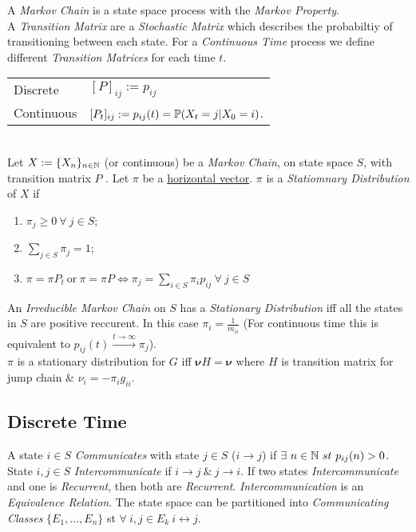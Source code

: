 \documentclass[11pt,a4paper]{article}
\begin{document}
A \textit{Markov Chain} is a state space process with the \textit{Markov Property}.\\

A \textit{Transition Matrix} are a \textit{Stochastic Matrix} which describes the probabiltiy of transitioning between each state. For a \textit{Continuous Time} process we define different \textit{Transition Matrices} for each time $t$.\\
\begin{tabular}{ll}
Discrete&$[P]_{ij}:=p_{ij}$\\
Continuous&$[P_t]_{ij}:=p_{ij}(t)=\mathbb{P}(X_t=j|X_0=i)$.
\end{tabular}\\

Let $X:=\{X_n\}_{n\in\mathbb{N}}$ (or continuous) be a \textit{Markov Chain}, on state space $S$, with transition matrix $P$ . Let $\pi$ be a \underline{horizontal vector}. $\pi$ is a \textit{Statiomnary Distribution} of $X$ if
\begin{enumerate}
	\item $\pi_j\geq0\ \forall\ j\in S$;
	\item $\sum_{j\in S}\pi_j=1$;
	\item $\pi=\pi P_t\ \mathrm{or}\ \pi=\pi P\Leftrightarrow\pi_j=\sum_{i\in S}\pi_ip_{ij}\ \forall\ j\in S$
\end{enumerate}
An \textit{Irreducible Markov Chain} on $S$ has a \textit{Stationary Distribution} iff all the states in $S$ are positive reccurent. In this case $\pi_i=\frac{1}{m_{ii}}$ (For continuous time this is equivalent to $p_{ij}(t)\xrightarrow{t\to\infty}\pi_j$).\\
\nb $\pi$ is a stationary distribution for $G$ iff $\pmb{\nu} H=\pmb{\nu}$ where $H$ is transition matrix for jump chain \& $\nu_i=-\pi_ig_{ii}$.

\subsection{Discrete Time}

A state $i\in S$ \textit{Communicates} with state $j\in S$ ($i\to j$) if $\exists\ n\in\nats\ st\ p_{ij}(n)>0$. State $i,j\in S$ \textit{Intercommunicate} if $i\to j\ \&\ j\to i$. If two states \textit{Intercommunicate} and one is \textit{Recurrent}, then both are \textit{Recurrent}. \textit{Intercommunication} is an \textit{Equivalence Relation}. The state space can be partitioned into \textit{Communicating Classes} $\{E_1,\dots,E_n\}$ st $\forall\ i,j\in E_k\ i\leftrightarrow j$.\\
\end{document}

